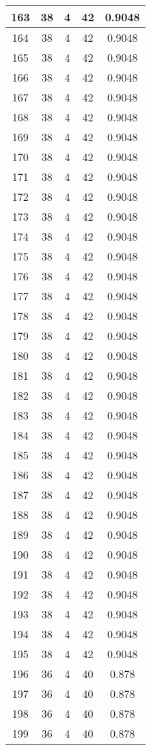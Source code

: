 \documentclass[letterpaper, 12pt]{article}
\begin{document}
\begin{longtable}{|c|c|c|c|c|}
\hline
163 & 38 & 4 & 42 & 0.9048 \\
\hline
164 & 38 & 4 & 42 & 0.9048 \\
\hline
165 & 38 & 4 & 42 & 0.9048 \\
\hline
166 & 38 & 4 & 42 & 0.9048 \\
\hline
167 & 38 & 4 & 42 & 0.9048 \\
\hline
168 & 38 & 4 & 42 & 0.9048 \\
\hline
169 & 38 & 4 & 42 & 0.9048 \\
\hline
170 & 38 & 4 & 42 & 0.9048 \\
\hline
171 & 38 & 4 & 42 & 0.9048 \\
\hline
172 & 38 & 4 & 42 & 0.9048 \\
\hline
173 & 38 & 4 & 42 & 0.9048 \\
\hline
174 & 38 & 4 & 42 & 0.9048 \\
\hline
175 & 38 & 4 & 42 & 0.9048 \\
\hline
176 & 38 & 4 & 42 & 0.9048 \\
\hline
177 & 38 & 4 & 42 & 0.9048 \\
\hline
178 & 38 & 4 & 42 & 0.9048 \\
\hline
179 & 38 & 4 & 42 & 0.9048 \\
\hline
180 & 38 & 4 & 42 & 0.9048 \\
\hline
181 & 38 & 4 & 42 & 0.9048 \\
\hline
182 & 38 & 4 & 42 & 0.9048 \\
\hline
183 & 38 & 4 & 42 & 0.9048 \\
\hline
184 & 38 & 4 & 42 & 0.9048 \\
\hline
185 & 38 & 4 & 42 & 0.9048 \\
\hline
186 & 38 & 4 & 42 & 0.9048 \\
\hline
187 & 38 & 4 & 42 & 0.9048 \\
\hline
188 & 38 & 4 & 42 & 0.9048 \\
\hline
189 & 38 & 4 & 42 & 0.9048 \\
\hline
190 & 38 & 4 & 42 & 0.9048 \\
\hline
191 & 38 & 4 & 42 & 0.9048 \\
\hline
192 & 38 & 4 & 42 & 0.9048 \\
\hline
193 & 38 & 4 & 42 & 0.9048 \\
\hline
194 & 38 & 4 & 42 & 0.9048 \\
\hline
195 & 38 & 4 & 42 & 0.9048 \\
\hline
196 & 36 & 4 & 40 & 0.878 \\
\hline
197 & 36 & 4 & 40 & 0.878 \\
\hline
198 & 36 & 4 & 40 & 0.878 \\
\hline
199 & 36 & 4 & 40 & 0.878 \\
\hline
\end{longtable}
\end{document}
